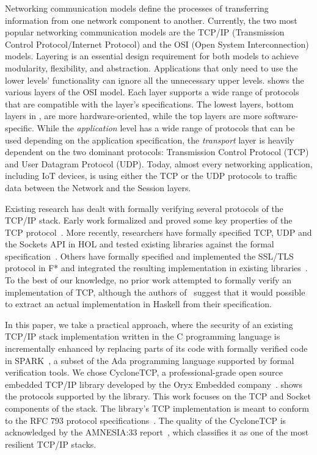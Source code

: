\documentclass[conference]{IEEEtran}
\begin{document}
Networking communication models define the processes of transferring information from one network component to another. Currently, the two most popular networking communication models are the TCP/IP (Transmission Control Protocol/Internet Protocol) \cite{TCP_IP:ietf_tutorial} and the OSI (Open System Interconnection) \cite{ISO:35.100} models. Layering is an essential design requirement for both models to achieve modularity, flexibility, and abstraction. Applications that only need to use the lower levels' functionality can ignore all the unnecessary upper levels.  shows the various layers of the OSI model. Each layer supports a wide range of protocols that are compatible with the layer's specifications. The lowest layers, bottom layers in , are more hardware-oriented, while the top layers are more software-specific. While the \emph{application} level has a wide range of protocols that can be used depending on the application specification, the \emph{transport} layer is heavily dependent on the two dominant protocols: Transmission Control Protocol (TCP) and User Datagram Protocol (UDP). Today, almost every networking application, including IoT devices, is using either the TCP or the UDP protocols to traffic data between the Network and the Session layers. %



Existing research has dealt with formally verifying several protocols of the TCP/IP stack. Early work formalized and proved some key properties of the TCP protocol~\cite{smith1996formal}. More recently, researchers have formally specified TCP, UDP and the Sockets API in HOL and tested existing libraries against the formal specification~\cite{tcp2005sigcomm,ridge2008rigorous}. Others have formally specified and implemented the SSL/TLS protocol in F* and integrated the resulting implementation in existing libraries~\cite{bhargavan2013implementing}. To the best of our knowledge, no prior work attempted to formally verify an implementation of TCP, although the authors of~\cite{ridge2008rigorous} suggest that it would possible to extract an actual implementation in Haskell from their specification.

In this paper, we take a practical approach, where the security of an existing TCP/IP stack implementation written in the C programming language is incrementally enhanced by replacing parts of its code with formally verified code in SPARK~\cite{mccormick_chapin_2015}, a subset of the Ada programming language supported by formal verification tools. We chose CycloneTCP, a professional-grade open source embedded TCP/IP library developed by the Oryx Embedded company~\cite{CycloneTCP}.  shows the protocols supported by the library. This work focuses on the TCP and Socket components of the stack. The library's TCP implementation is meant to conform to the RFC 793 protocol specifications~\cite{rfc793}. The quality of the CycloneTCP is acknowledged by the AMNESIA:33 report~\cite{AMNESIA33}, which classifies it as one of the most resilient TCP/IP stacks.
\end{document}
